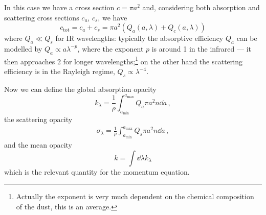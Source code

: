\documentclass[main.tex]{subfiles}
\begin{document}
In this case we have a cross section $c=\pi a^2$ and, considering both absorption and scattering cross sections $c_a$, $c_s$, we have
%
\begin{equation}
c_{\text{tot}}
=c_a+c_s
=\pi a^2(Q_a(a,\lambda)+Q_c(a,\lambda))
\end{equation}
%
where $Q_a \ll Q_s$ for IR wavelengths: typically the absorptive efficiency \(Q_a\) can be modelled by \(Q_a \propto a \lambda^{-p}\), where the exponent \(p\) is around 1 in the infrared --- it then approaches 2 for longer wavelengths;\footnote{Actually the exponent is very much dependent on the chemical composition of the dust, this is an average.} on the other hand the scattering efficiency is in the Rayleigh regime, \(Q_s \propto \lambda^{-4}\).

Now we can define the global absorption opacity
%
\begin{equation}
k_\lambda=\frac{1}{\rho } \int_{a_{\text{min}}}^{a_{\text{max}}}Q_a\pi a^2 n \dd{a}
\,,
\end{equation}
%
the scattering opacity 
%
\begin{align}
\sigma_{\lambda } = \frac{1}{\rho } \int_{a_{\text{min}}}^{a_{\text{max}}} Q_s \pi a^2 n \dd{a}
\,,
\end{align}
%
and the mean opacity
%
\begin{equation}
k=\int \dd{\lambda} k_\lambda
\end{equation}
%
which is the relevant quantity for the momentum equation.
\end{document}
